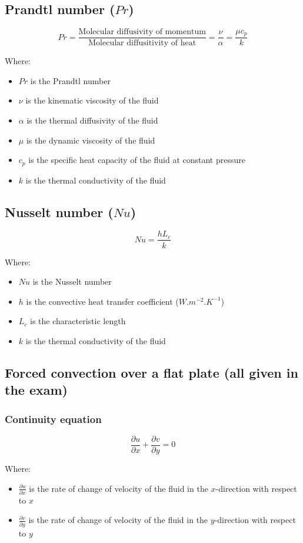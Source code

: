 \documentclass[11pt]{article}
\begin{document}
\subsection{Prandtl number (\(Pr\))}
\label{sec:org3e7fb7b}
\[Pr = \frac{\text{Molecular diffusivity of momentum}}{\text{Molecular diffusitivity of heat}} = \frac{\nu}{\alpha} = \frac{\mu c_p}{k}\]

Where:
\begin{itemize}
\item \(Pr\) is the Prandtl number
\item \(\nu\) is the kinematic viscosity of the fluid
\item \(\alpha\) is the thermal diffusivity of the fluid
\item \(\mu\) is the dynamic viscosity of the fluid
\item \(c_p\) is the specific heat capacity of the fluid at constant pressure
\item \(k\) is the thermal conductivity of the fluid
\end{itemize}

\subsection{Nusselt number (\(Nu\))}
\label{sec:orga7000b0}
\[Nu = \frac{hL_c}{k}\]

Where:
\begin{itemize}
\item \(Nu\) is the Nusselt number
\item \(h\) is the convective heat transfer coefficient (\(\unit{W.m^{-2}.K^{-1}}\))
\item \(L_c\) is the characteristic length
\item \(k\) is the thermal conductivity of the fluid
\end{itemize}

\subsection{Forced convection over a flat plate (all given in the exam)}
\label{sec:org7d3f029}

\subsubsection{Continuity equation}
\label{sec:org2845882}
\[\frac{\partial u}{\partial x} + \frac{\partial v}{\partial y} = 0\]

Where:
\begin{itemize}
\item \(\frac{\partial u}{\partial x}\) is the rate of change of velocity of the fluid in the \(x\)-direction with respect to \(x\)
\item \(\frac{\partial v}{\partial y}\) is the rate of change of velocity of the fluid in the \(y\)-direction with respect to \(y\)
\end{itemize}
\end{document}
